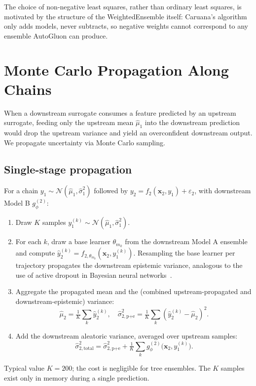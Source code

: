 \documentclass[conference]{IEEEtran}
\begin{document}
The choice of non-negative least squares, rather than ordinary least squares, is motivated by the structure of the WeightedEnsemble itself: Caruana's algorithm only adds models, never subtracts, so negative weights cannot correspond to any ensemble AutoGluon can produce.

\section{Monte Carlo Propagation Along Chains}
\label{sec:propagation}

When a downstream surrogate consumes a feature predicted by an upstream surrogate, feeding only the upstream mean $\hat\mu_1$ into the downstream prediction would drop the upstream variance and yield an overconfident downstream output. We propagate uncertainty via Monte Carlo sampling.

\subsection{Single-stage propagation}

For a chain $y_1 \sim \mathcal{N}(\hat\mu_1, \hat\sigma_1^2)$ followed by $y_2 = f_2(\bm x_2, y_1) + \varepsilon_2$, with downstream Model B $g_\phi^{(2)}$:

\begin{enumerate}
    \item Draw $K$ samples $y_1^{(k)} \sim \mathcal{N}(\hat\mu_1, \hat\sigma_1^2)$.
    \item For each $k$, draw a base learner $\theta_{m_k}$ from the downstream Model A ensemble and compute $\hat y_2^{(k)} = f_{2,\theta_{m_k}}(\bm x_2, y_1^{(k)})$. Resampling the base learner per trajectory propagates the downstream epistemic variance, analogous to the use of active dropout in Bayesian neural networks~\cite{gal2016}.
    \item Aggregate the propagated mean and the (combined upstream-propagated and downstream-epistemic) variance:
    \[
    \hat\mu_2 = \tfrac{1}{K}\sum_k \hat y_2^{(k)}, \quad
    \hat\sigma^2_{2,\text{p+e}} = \tfrac{1}{K}\sum_k (\hat y_2^{(k)} - \hat\mu_2)^2.
    \]
    \item Add the downstream aleatoric variance, averaged over upstream samples:
    \[
    \hat\sigma^2_{2,\text{total}} = \hat\sigma^2_{2,\text{p+e}} + \tfrac{1}{K}\sum_k g_\phi^{(2)}\!\big(\bm x_2, y_1^{(k)}\big).
    \]
\end{enumerate}
Typical value $K = 200$; the cost is negligible for tree ensembles. The $K$ samples exist only in memory during a single prediction.
\end{document}
